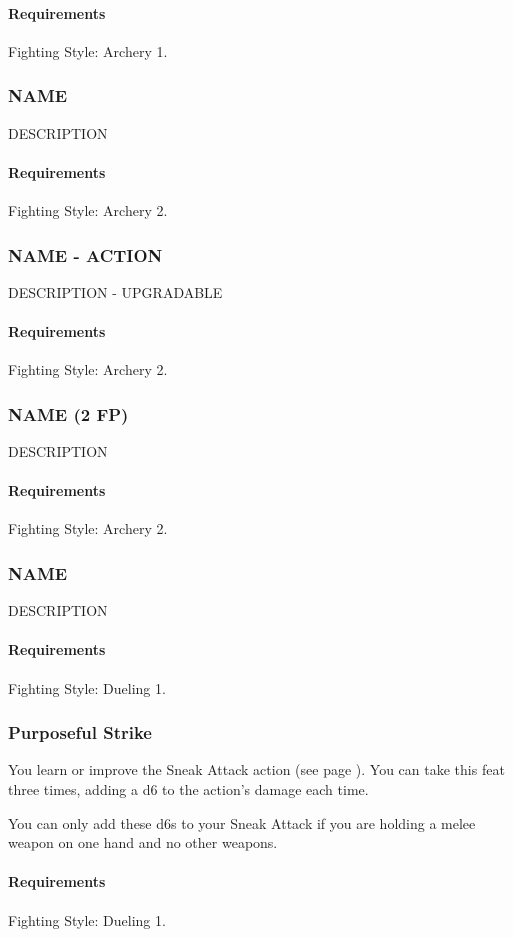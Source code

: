     \paragraph{Requirements} Fighting Style: Archery 1.
\subsubsection{NAME} \label{feat::name}
    DESCRIPTION
    \paragraph{Requirements} Fighting Style: Archery 2.
\subsubsection{NAME - ACTION} \label{feat::name}
    DESCRIPTION - UPGRADABLE
    \paragraph{Requirements} Fighting Style: Archery 2.
\subsubsection{NAME (2 FP)} \label{feat::name}
    DESCRIPTION
    \paragraph{Requirements} Fighting Style: Archery 2.
\subsubsection{NAME} \label{feat::name}
    DESCRIPTION
    \paragraph{Requirements} Fighting Style: Dueling 1.
\subsubsection{Purposeful Strike} \label{feat::purposefulstrike}
    You learn or improve the Sneak Attack action (see page \pageref{act:sneakattack}).
    You can take this feat three times, adding a d6 to the action's damage each time.

    You can only add these d6s to your Sneak Attack if you are holding a melee weapon on one hand and no other weapons.
    \paragraph{Requirements} Fighting Style: Dueling 1.
